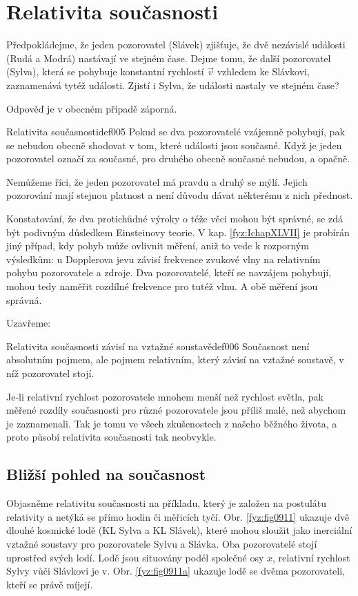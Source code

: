   \section{Relativita současnosti}
    Předpokládejme, že jeden pozorovatel (Slávek) zjišťuje, že dvě nezávislé události (Rudá a Modrá)
    nastávají ve stejném čase. Dejme tomu, že další pozorovatel (Sylva), která se pohybuje
    konstantní rychlostí \(\vec{v}\) vzhledem ke Slávkovi, zaznamenává tytéž události. Zjistí i
    Sylva, že události nastaly ve stejném čase?

    Odpověď je v obecném případě záporná.
    \begin{fyzdef}{Relativita současnosti}{def005}          
      Pokud se dva pozorovatelé vzájemně pohybují, pak se nebudou obecně shodovat v tom, které
      události jsou současné. Když je jeden pozorovatel označí za současné, pro druhého obecně
      současné nebudou, a opačně.
    \end{fyzdef}

    Nemůžeme říci, že jeden pozorovatel má pravdu a druhý se mýlí. Jejich pozorování mají stejnou
    platnost a není důvodu dávat některému z nich přednost.

    Konstatování, že dva protichůdné výroky o téže věci mohou být správné, se zdá být podivným
    důsledkem Einsteinovy teorie. V kap. \ref{fyz:IchapXLVII} je probírán jiný případ, kdy pohyb
    může ovlivnit měření, aniž to vede k rozporným výsledkům: u Dopplerova jevu závisí frekvence
    zvukové vlny na relativním pohybu pozorovatele a zdroje. Dva pozorovatelé, kteří se navzájem
    pohybují, mohou tedy naměřit rozdílné frekvence pro tutéž vlnu. A obě měření jsou správná.

    Uzavřeme:
    \begin{fyzdef}{Relativita současnosti závisí na vztažné soustavě}{def006}          
      Současnost není absolutním pojmem, ale pojmem relativním, který závisí na vztažné soustavě,
      v níž pozorovatel stojí.
    \end{fyzdef}

    Je-li relativní rychlost pozorovatele mnohem menší než rychlost světla, pak měřené rozdíly
    současnosti pro různé pozorovatele jsou příliš malé, než abychom je zaznamenali. Tak je tomu ve
    všech zkušenostech z našeho běžného života, a proto působí relativita současnosti tak neobvykle.

    \subsection{Bližší pohled na současnost}
      Objasněme relativitu současnosti na příkladu, který je založen na postulátu relativity a
      netýká se přímo hodin či měřicích tyčí. Obr. \ref{fyz:fig0911} ukazuje dvě dlouhé kosmické lodě
      (KL Sylva a KL Slávek), které mohou sloužit jako inerciální vztažné soustavy pro pozorovatele
      Sylvu a Slávka. Oba pozorovatelé stojí uprostřed svých lodí. Lodě jsou situovány podél
      společné osy \(x\), relativní rychlost Sylvy vůči Slávkovi je v. Obr. \ref{fyz:fig0911a}
      ukazuje lodě se dvěma pozorovateli, kteří se právě míjejí.

